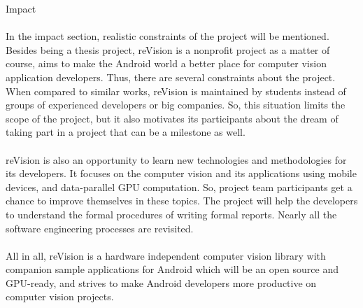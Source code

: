 \documentclass[12pt, a4paper]{article} \pagenumbering{gobble}
\begin{document}
\newpage

\begin{section}{Impact}

\paragraph{}{
In the impact section, realistic constraints of the project will be mentioned. Besides being a thesis project,
reVision is a nonprofit project as a matter of course, aims to make the Android world a better place for computer vision
application developers. Thus, there are several constraints about the project. When compared to similar works,
reVision is maintained by students instead of groups of experienced developers or big companies.
So, this situation limits the scope of the project, but it also motivates its participants about the dream of
taking part in a project that can be a milestone as well.

}

\paragraph{}{
  reVision is also an opportunity to learn new technologies and methodologies for its developers. It focuses on the
  computer vision and its applications using mobile devices, and data-parallel GPU computation. So, project team participants
  get a chance to improve themselves in these topics. The project will help the developers to understand the formal procedures
  of writing formal reports. Nearly all the software engineering processes are revisited.
}

\paragraph{}{
  All in all,  reVision is a hardware independent computer vision library with companion sample applications
  for Android which will be an open source and GPU-ready, and strives to make Android developers more productive
  on computer vision projects.

}

\end{section}
\end{document}
